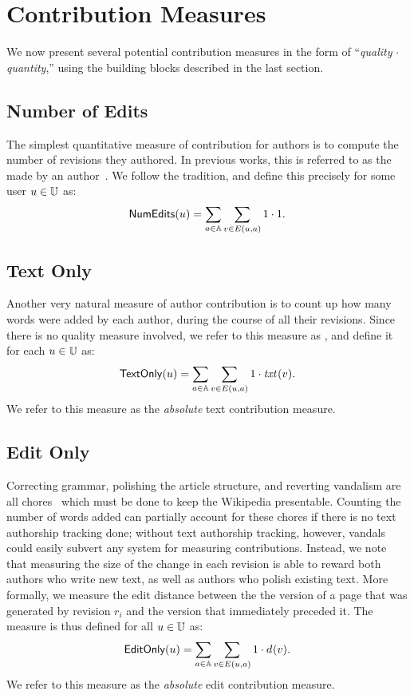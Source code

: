 \section{Contribution Measures}

We now present several potential contribution measures in the form of
``\textit{quality} $\cdot$ \textit{quantity},''
using the building blocks described in the last section.

\subsection{Number of Edits}

\noindent
The simplest quantitative measure of contribution for 
authors is to compute the number of revisions they authored.
In previous works, this is referred to as the 
 made by an 
author~\cite{Wales2005,EditsEqQuality2007,Bourgeoisie2007,SteinHess2007}.
We follow the tradition, and define this precisely
for some user $u \in \mathbb{U}$ as:
%
\[
\mathsf{NumEdits}(u) = \sum_{a \in \mathbb{A}} \sum_{v \in E(u, a)} 1 \cdot 1.
\]
%

\subsection{Text Only}

\noindent
Another very natural measure of author contribution
is to count up how many words were added by each author,
during the course of all their revisions.
Since there is no quality measure involved,
we refer to this measure as \textonly,
and define it for each $u \in \mathbb{U}$ as:
%
\[
\mathsf{TextOnly}(u) = \sum_{a \in \mathbb{A}} \sum_{v \in E(u, a)} 1 \cdot \mathit{txt}_{}(v).
\]
%
We refer to this measure as the {\em absolute\/} text contribution
measure.

\subsection{Edit Only}

\noindent
Correcting grammar, polishing the article structure,
and reverting vandalism are all chores~\cite{AdministratorMop2008}
which must be done to keep the Wikipedia presentable.
Counting the number of words added can partially account
for these chores if there is no text authorship tracking done;
without text authorship tracking, however, vandals could
easily subvert any system for measuring contributions.
Instead, we note that measuring the size of the change
in each revision is able to reward both authors who write
new text, as well as authors who polish existing text.
More formally, we measure the edit distance between the
the version of a page that was generated by revision $r_i$
and the version that immediately preceded it.
The \editonly measure is thus defined for all $u \in \mathbb{U}$ as:
%
\[
\mathsf{EditOnly}(u) = \sum_{a \in \mathbb{A}} \sum_{v \in E(u, a)} 1 \cdot d_{}(v).
\]
%
We refer to this measure as the {\em absolute\/} edit contribution
measure.

